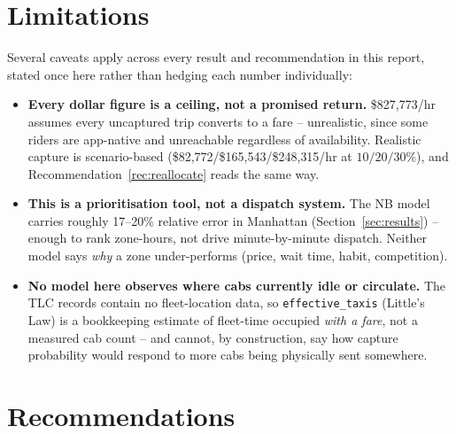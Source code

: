 \documentclass[11pt]{article}
\begin{document}
\FloatBarrier
\section{Limitations}
\label{sec:limitations}

Several caveats apply across every result and recommendation in this report, stated once here rather
than hedging each number individually:

\begin{itemize}
\item \textbf{Every dollar figure is a ceiling, not a promised return.} \$827{,}773/hr assumes every uncaptured trip converts to a fare -- unrealistic, since some riders are app-native and unreachable regardless of availability. Realistic capture is scenario-based (\$82{,}772/\$165{,}543/\$248{,}315/hr at $10/20/30\%$), and Recommendation~\ref{rec:reallocate} reads the same way.
\item \textbf{This is a prioritisation tool, not a dispatch system.} The NB model carries roughly 17--20\% relative error in Manhattan (Section~\ref{sec:results}) -- enough to rank zone-hours, not drive minute-by-minute dispatch. Neither model says \emph{why} a zone under-performs (price, wait time, habit, competition).
\item \textbf{No model here observes where cabs currently idle or circulate.} The TLC records contain
no fleet-location data, so \texttt{effective\_taxis} (Little's Law) is a bookkeeping estimate of
fleet-time occupied \emph{with a fare}, not a measured cab count -- and cannot, by construction, say
how capture probability would respond to more cabs being physically sent somewhere.
\end{itemize}

\FloatBarrier
\section{Recommendations}
\label{sec:recommendations}
\end{document}
